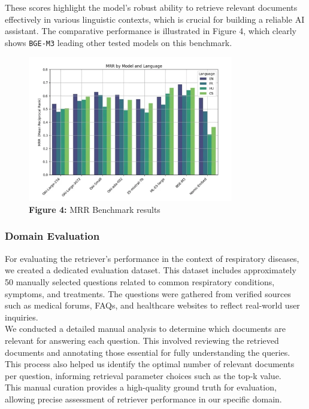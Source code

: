 These scores highlight the model's robust ability to retrieve relevant documents effectively in various linguistic contexts, which is crucial for building a reliable AI assistant. The comparative performance is illustrated in Figure 4, which clearly shows \texttt{BGE-M3} leading other tested models on this benchmark.
\begin{figure}[htbp]
  \centering
  \includegraphics[width=0.8\textwidth]{images/MRR.png}
  \caption*{\textbf{Figure 4:} MRR Benchmark results} %
  \label{fig:indexing-process-manual}
\end{figure}


\subsubsection{Domain Evaluation}
For evaluating the retriever’s performance in the context of respiratory diseases, we created a dedicated evaluation dataset. This dataset includes approximately 50 manually selected questions related to common respiratory conditions, symptoms, and treatments. The questions were gathered from verified sources such as medical forums, FAQs, and healthcare websites to reflect real-world user inquiries. \\
We conducted a detailed manual analysis to determine which documents are relevant for answering each question. This involved reviewing the retrieved documents and annotating those essential for fully understanding the queries. This process also helped us identify the optimal number of relevant documents per question, informing retrieval parameter choices such as the top-k value. \\
This manual curation provides a high-quality ground truth for evaluation, allowing precise assessment of retriever performance in our specific domain.

